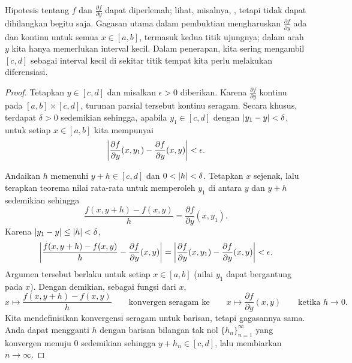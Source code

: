 Hipotesis tentang $f$ dan $\frac{\partial f}{\partial y}$ dapat
diperlemah; lihat, misalnya, ,
tetapi tidak dapat dihilangkan begitu saja.
Gagasan utama dalam pembuktian mengharuskan
$\frac{\partial f}{\partial y}$ ada dan kontinu untuk semua $x \in [a,b]$,
termasuk kedua titik ujungnya; dalam arah $y$ kita hanya memerlukan
interval kecil.  Dalam penerapan, kita sering mengambil $[c,d]$ sebagai
interval kecil di sekitar titik tempat kita perlu melakukan diferensiasi.

\begin{proof}
Tetapkan $y \in [c,d]$ dan misalkan $\epsilon > 0$ diberikan.
Karena $\frac{\partial f}{\partial y}$ kontinu pada $[a,b] \times [c,d]$, turunan parsial tersebut
kontinu seragam.  Secara khusus, terdapat $\delta > 0$ sedemikian sehingga,
apabila $y_1 \in [c,d]$ dengan
$\lvert {y_1-y} \rvert < \delta$, untuk setiap $x \in [a,b]$ kita mempunyai
\begin{equation*}
\left\lvert {\frac{\partial f}{\partial y}(x,y_1)-\frac{\partial f}{\partial y}(x,y)} \right\rvert < \epsilon .
\end{equation*}

Andaikan $h$ memenuhi $y+h \in [c,d]$ dan $0 < \lvert {h} \rvert < \delta$.
Tetapkan $x$ sejenak,
lalu terapkan teorema nilai rata-rata untuk memperoleh $y_1$ di antara $y$ dan $y+h$ sedemikian sehingga
\begin{equation*}
\frac{f(x,y+h)-f(x,y)}{h}
=
\frac{\partial f}{\partial y}(x,y_1) .
\end{equation*}
Karena $\lvert {y_1-y} \rvert \leq \lvert {h} \rvert < \delta$,
\begin{equation*}
\left\lvert {
\frac{f(x,y+h)-f(x,y)}{h}
-
\frac{\partial f}{\partial y}(x,y) 
} \right\rvert
=
\left\lvert {
\frac{\partial f}{\partial y}(x,y_1) 
-
\frac{\partial f}{\partial y}(x,y) 
} \right\rvert
< \epsilon .
\end{equation*}
Argumen tersebut berlaku untuk setiap $x \in [a,b]$ (nilai $y_1$ dapat
bergantung pada $x$).  Dengan demikian, sebagai fungsi dari
$x$,
\begin{equation*}
x \mapsto \frac{f(x,y+h)-f(x,y)}{h}
\qquad
\text{konvergen seragam ke}
\qquad
x \mapsto \frac{\partial f}{\partial y}(x,y)
\qquad
\text{ketika } h \to 0 .
\end{equation*}
Kita mendefinisikan konvergensi seragam untuk barisan, tetapi gagasannya
sama.  Anda dapat mengganti $h$ dengan barisan bilangan tak nol
$\{ h_n \}_{n=1}^\infty$
yang konvergen menuju $0$ sedemikian sehingga $y+h_n \in [c,d]$, lalu membiarkan $n \to \infty$.


\end{proof}
